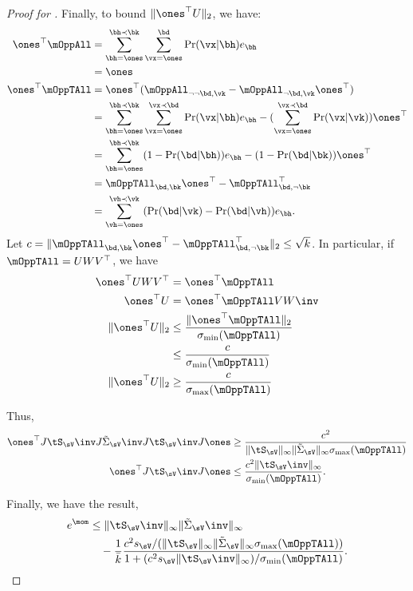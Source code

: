 \begin{proof}[Proof for ]
  Finally, to bound $\|\ones^\top U\|_2$, we have:
  \begin{align*}
    \ones^\top \mOppAll 
      &= \sum_{\bh = \ones}^{\bh \prec \bk} \sum_{\vx = \ones}^{\bd} \Pr(\vx | \bh) e_\bh  \\
      &= \ones \\
    \ones^\top \mOppTAll 
        &= \ones^\top (\mOppAll_{\neg \neg \bd, \vk} - \mOppAll_{\neg \bd, \vk}\ones^\top) \\
        &= \sum_{\bh = \ones}^{\bh \prec \bk} \sum_{\vx = \ones}^{\vx \prec \bd} \Pr(\vx | \bh) e_\bh - (\sum_{\vx = \ones}^{\vx \prec \bd} \Pr(\vx | \vk)) \ones^\top  \\
        &= \sum_{\bh = \ones}^{\bh \prec \bk} (1 - \Pr(\bd | \bh)) e_\bh - (1 - \Pr(\bd | \bk)) \ones^\top  \\
        &= \mOppTAll_{\bd,\bk} \ones^\top - \mOppTAll_{\bd,\neg \bk}^\top \\
        &= \sum_{\vh = \ones}^{\vh \prec \vk} (\Pr(\bd | \vk) - \Pr(\bd | \vh))e_\bh.
  \end{align*}
  Let $c = \|\mOppTAll_{\bd,\bk} \ones^\top - \mOppTAll_{\bd,\neg
  \bk}^\top\|_2 \le \sqrt{k}$.
  In particular, if $\mOppTAll = U W V^\top$, we have 
  \begin{align*}
    \ones^\top U W V^\top 
        &= \ones^\top \mOppTAll \\
    \ones^\top U 
      &= \ones^\top \mOppTAll V W\inv \\
    \|\ones^\top U\|_2 
        &\le \frac{\|\ones^\top \mOppTAll\|_2}{\sigma_{\min}(\mOppTAll)} \\
        &\le \frac{c}{\sigma_{\min}(\mOppTAll)} \\
    \|\ones^\top U\|_2 
        &\ge \frac{c}{\sigma_{\max}(\mOppTAll)} \\
  \end{align*}

  Thus,
  \begin{align*}
      \ones^\top J \tS_\sV\inv J \tilde\Sigma_\sV\inv J \tS_\sV\inv J \ones 
      &\ge \frac
          {c^2}
          { \|\tS_\sV\|_{\infty} \|\tilde\Sigma_\sV\|_{\infty}
          \sigma_{\max}(\mOppTAll)} \\
      \ones^\top J \tS_\sV\inv J \ones  
      &\le \frac
          {c^2 \|\tS_\sV\inv\|_{\infty}}
          {\sigma_{\min}(\mOppTAll)}.
  \end{align*}

  Finally, we have the result,
  \begin{align*}
    e^\mom 
    &\le \|\tS_\sV\inv\|_\infty  \|\tilde\Sigma_\sV\inv\|_\infty \\
    &\quad - 
        \frac{1}{\bar k} 
    \frac{
        c^2 s_\sV/(\|\tS_\sV\|_{\infty} \|\tilde\Sigma_\sV\|_{\infty}
            \sigma_{\max}(\mOppTAll))
    }
    {1 + (c^2 s_\sV \|\tS_\sV\inv\|_{\infty})/
          \sigma_{\min}(\mOppTAll)
    }.
  \end{align*}


\end{proof}
